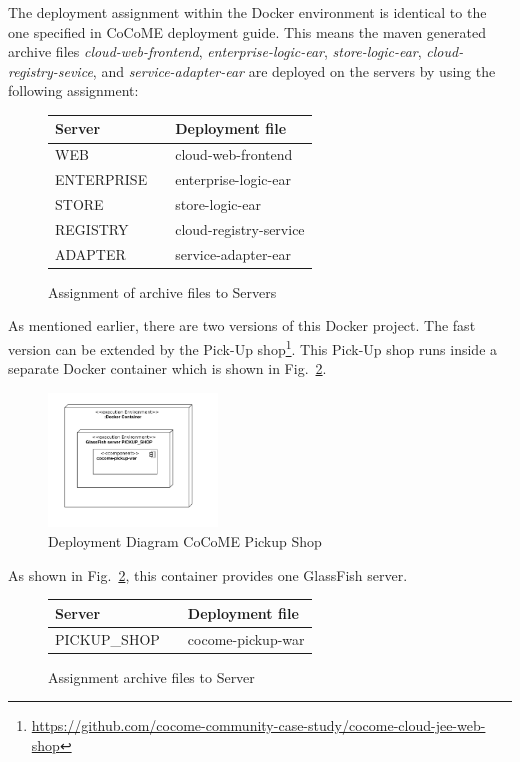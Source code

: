  	\noindent
 	The deployment assignment within the Docker environment is identical to the one specified in CoCoME deployment guide.
 	This means the maven generated archive files \textit{cloud-web-frontend}, \textit{enterprise-logic-ear}, \textit{store-logic-ear}, \textit{cloud-registry-sevice}, and \textit{service-adapter-ear} are deployed on the servers by using the following assignment:
 	\begin{figure}[H]
 		\centering
 		\begin{tabular}{l| l l}%
 			Server && Deployment file \\
 			\hline
 			WEB && cloud-web-frontend  \\
 			ENTERPRISE && enterprise-logic-ear  \\
 			STORE && store-logic-ear  \\
 			REGISTRY && cloud-registry-service  \\
 			ADAPTER && service-adapter-ear \\	
 		\end{tabular}
 		\caption{Assignment of archive files to Servers}
 		\label{table_assignment}
 	\end{figure}
 \noindent
    As mentioned earlier, there are two versions of this Docker project.
 	 The fast version can be extended by the Pick-Up shop\footnote{\url{https://github.com/cocome-community-case-study/cocome-cloud-jee-web-shop}}. This Pick-Up shop runs inside a separate Docker container which is shown in Fig.~\ref{Deploym_Pickup}.  
 	\begin{figure}[h]
 		\centering
 		\includegraphics[width = 0.4\textwidth]{img/docker_Container_PickUP.pdf}
 		\caption{Deployment Diagram CoCoME Pickup Shop}
 		\label{Deploym_Pickup}
 	\end{figure}
 	As shown in Fig.~\ref{Deploym_Pickup}, this container provides one GlassFish server.
 	\begin{figure}[H]
 		\centering
 		\begin{tabular}{l|l l}%
 			Server && Deployment file \\
 			\hline
 			PICKUP\_SHOP && cocome-pickup-war \\	
 		\end{tabular}
 		\caption{Assignment archive files to Server}
 		\label{table_assignment_pickup}
 	\end{figure}
